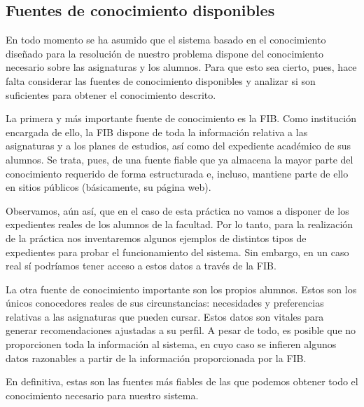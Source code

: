 
\subsection{Fuentes de conocimiento disponibles} \label{sec:conocimiento}

En todo momento se ha asumido que el sistema basado en el conocimiento 
diseñado para la resolución de nuestro problema dispone del conocimiento 
necesario sobre las asignaturas y los alumnos. Para que esto sea cierto, pues, 
hace falta considerar las fuentes de conocimiento disponibles y analizar si 
son suficientes para obtener el conocimiento descrito.

La primera y más importante fuente de conocimiento es la FIB. Como institución 
encargada de ello, la FIB dispone de toda la información relativa a las 
asignaturas y a los planes de estudios, así como del expediente académico de 
sus alumnos. Se trata, pues, de una fuente fiable que ya almacena la mayor 
parte del conocimiento requerido de forma estructurada e, incluso, mantiene 
parte de ello en sitios públicos (básicamente, su página web). 

Observamos, aún así, que en el caso de esta práctica no vamos a disponer de 
los expedientes reales de los alumnos de la facultad. Por lo tanto, para la 
realización de la práctica nos inventaremos algunos ejemplos de distintos 
tipos de expedientes para probar el funcionamiento del sistema. Sin embargo, 
en un caso real sí podríamos tener acceso a estos datos a través de la FIB.

La otra fuente de conocimiento importante son los propios alumnos. Estos son 
los únicos conocedores reales de sus circunstancias: necesidades y 
preferencias relativas a las asignaturas que pueden cursar. Estos datos son 
vitales para generar recomendaciones ajustadas a su perfil. A pesar de todo, 
es posible que no proporcionen toda la información al sistema, en cuyo caso 
se infieren algunos datos razonables a partir de la información proporcionada 
por la FIB.

En definitiva, estas son las fuentes más fiables de las que podemos obtener 
todo el conocimiento necesario para nuestro sistema.



